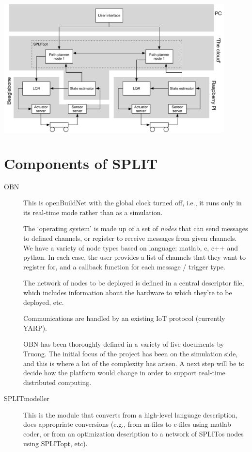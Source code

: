 \documentclass[11pt,a4paper]{article}
\begin{document}
\includegraphics[width=0.9\textwidth]{split_use_case}


\section*{Components of SPLIT}
\begin{description}
  \item[OBN] This is openBuildNet with the global clock turned off, i.e., it runs only in its real-time mode rather than as a simulation.

  The `operating system' is made up of a set of \emph{nodes} that can send messages to defined channels, or register to receive messages from given channels. We have a variety of node types based on language: matlab, c, c++ and python. In each case, the user provides a list of channels that they want to register for, and a callback function for each message / trigger type.

  The network of nodes to be deployed is defined in a central descriptor file, which includes information about the hardware to which they're to be deployed, etc.

  Communications are handled by an existing IoT protocol (currently YARP).

  OBN has been thoroughly defined in a variety of live documents by Truong. The initial focus of the project has been on the simulation side, and this is where a lot of the complexity has arisen. A next step will be to decide how the platform would change in order to support real-time distributed computing.

  \item[SPLITmodeller] This is the module that converts from a high-level language description, does appropriate conversions (e.g., from m-files to c-files using matlab coder, or from an optimization description to a network of SPLITos nodes using SPLITopt, etc). 
\end{description}
\end{document}

